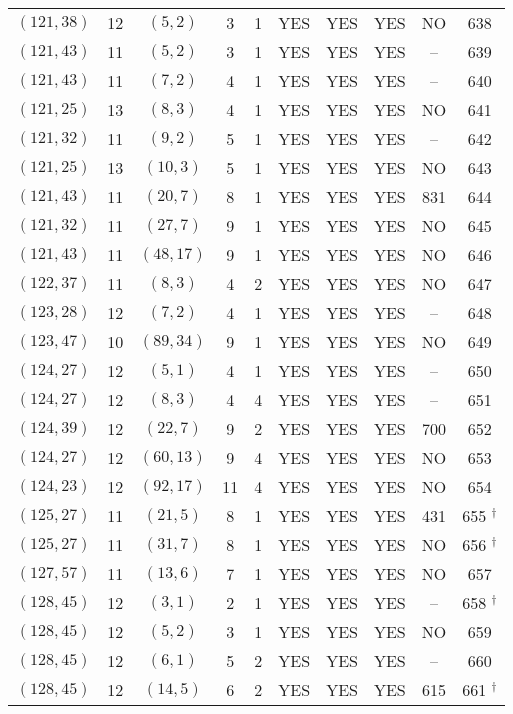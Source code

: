 \begin{longtable}{|c|c|c|c|c|c|c|c|c|c|}
$(121, 38)$ & 12 & $(5, 2)$ & 3 & 1 & YES & YES & YES & NO & 638\\
$(121, 43)$ & 11 & $(5, 2)$ & 3 & 1 & YES & YES & YES & -- & 639\\
$(121, 43)$ & 11 & $(7, 2)$ & 4 & 1 & YES & YES & YES & -- & 640\\
$(121, 25)$ & 13 & $(8, 3)$ & 4 & 1 & YES & YES & YES & NO & 641\\
$(121, 32)$ & 11 & $(9, 2)$ & 5 & 1 & YES & YES & YES & -- & 642\\
$(121, 25)$ & 13 & $(10, 3)$ & 5 & 1 & YES & YES & YES & NO & 643\\
$(121, 43)$ & 11 & $(20, 7)$ & 8 & 1 & YES & YES & YES & 831 & 644\\
$(121, 32)$ & 11 & $(27, 7)$ & 9 & 1 & YES & YES & YES & NO & 645\\
$(121, 43)$ & 11 & $(48, 17)$ & 9 & 1 & YES & YES & YES & NO & 646\\
$(122, 37)$ & 11 & $(8, 3)$ & 4 & 2 & YES & YES & YES & NO & 647\\
$(123, 28)$ & 12 & $(7, 2)$ & 4 & 1 & YES & YES & YES & -- & 648\\
$(123, 47)$ & 10 & $(89, 34)$ & 9 & 1 & YES & YES & YES & NO & 649\\
$(124, 27)$ & 12 & $(5, 1)$ & 4 & 1 & YES & YES & YES & -- & 650\\
$(124, 27)$ & 12 & $(8, 3)$ & 4 & 4 & YES & YES & YES & -- & 651\\
$(124, 39)$ & 12 & $(22, 7)$ & 9 & 2 & YES & YES & YES & 700 & 652\\
$(124, 27)$ & 12 & $(60, 13)$ & 9 & 4 & YES & YES & YES & NO & 653\\
$(124, 23)$ & 12 & $(92, 17)$ & 11 & 4 & YES & YES & YES & NO & 654\\
$(125, 27)$ & 11 & $(21, 5)$ & 8 & 1 & YES & YES & YES & 431 & 655 ${}^\dagger$\\
$(125, 27)$ & 11 & $(31, 7)$ & 8 & 1 & YES & YES & YES & NO & 656 ${}^\dagger$\\
$(127, 57)$ & 11 & $(13, 6)$ & 7 & 1 & YES & YES & YES & NO & 657\\
$(128, 45)$ & 12 & $(3, 1)$ & 2 & 1 & YES & YES & YES & -- & 658 ${}^\dagger$\\
$(128, 45)$ & 12 & $(5, 2)$ & 3 & 1 & YES & YES & YES & NO & 659\\
$(128, 45)$ & 12 & $(6, 1)$ & 5 & 2 & YES & YES & YES & -- & 660\\
$(128, 45)$ & 12 & $(14, 5)$ & 6 & 2 & YES & YES & YES & 615 & 661 ${}^\dagger$\\

\end{longtable}
